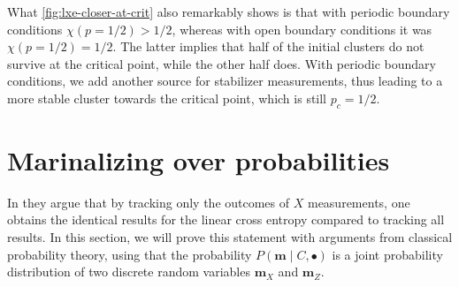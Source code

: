 What \cref{fig:lxe-closer-at-crit} also remarkably shows is that with periodic
boundary conditions $\chi(p=1 /2) > 1 /2$, whereas with open boundary
conditions it was $\chi(p=1 /2) = 1 /2$. The latter implies that half of the
initial clusters do not survive at the critical point, while the other half
does. With periodic boundary conditions, we add another source for stabilizer
measurements, thus leading to a more stable cluster towards the critical point,
which is still $p_c = 1 /2$. 
%
%    
%

\section{Marinalizing over probabilities}\label{sec:lxe-indep}
In \cite{tikhanovskayaUniversalityCrossEntropy2023} they argue that
by tracking only the outcomes of $X$ measurements, one obtains the identical
results for the linear cross entropy compared to tracking all results.
In this section, we will
prove this statement with arguments from classical probability theory,
using that the probability $P(\mathbf{m} \mid C, \bullet)$ is a joint probability
distribution of two discrete random variables $\mathbf{m}_X$ and
$\mathbf{m}_Z$. 

